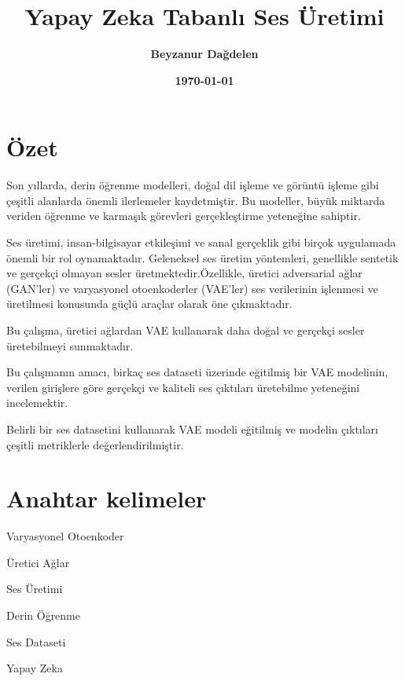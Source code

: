 \documentclass[12pt, a4paper]{article}
\title{\textbf{Yapay Zeka Tabanlı Ses Üretimi}\large }
\author{\textbf{Beyzanur Dağdelen}\large}
\date{\textbf{\today}}
\begin{document}
	
	\maketitle
	
	\thispagestyle{empty}
	
	\newpage
	\tableofcontents  %
	\newpage
	
	\section*{Özet }
	
	\vspace*{1\baselineskip}
	
	Son yıllarda, derin öğrenme modelleri, doğal dil işleme ve görüntü işleme gibi çeşitli alanlarda önemli ilerlemeler kaydetmiştir. Bu modeller, büyük miktarda veriden öğrenme ve karmaşık görevleri gerçekleştirme yeteneğine sahiptir.

	\vspace*{1\baselineskip}
	
	Ses üretimi, insan-bilgisayar etkileşimi ve sanal gerçeklik gibi birçok uygulamada önemli bir rol oynamaktadır. Geleneksel ses üretim yöntemleri, genellikle sentetik ve gerçekçi olmayan sesler üretmektedir.Özellikle, üretici adversarial ağlar (GAN'ler) ve varyasyonel otoenkoderler (VAE'ler) ses verilerinin işlenmesi ve üretilmesi konusunda güçlü araçlar olarak öne çıkmaktadır.
	
	\vspace*{1\baselineskip}
	
	Bu çalışma, üretici ağlardan VAE kullanarak daha doğal ve gerçekçi sesler üretebilmeyi sunmaktadır.
	
	\vspace*{1\baselineskip}
	
	Bu çalışmanın amacı, birkaç ses dataseti üzerinde eğitilmiş bir VAE modelinin, verilen girişlere göre gerçekçi ve kaliteli ses çıktıları üretebilme yeteneğini incelemektir.
	
	\vspace*{1\baselineskip}
	
	Belirli bir ses datasetini kullanarak VAE modeli eğitilmiş ve modelin çıktıları çeşitli metriklerle değerlendirilmiştir. 	
	
	\vspace*{2\baselineskip}
	\section*{\small \textbf{Anahtar kelimeler}}
	\begin{itemize}
		\small{
			\item Varyasyonel Otoenkoder
			\item Üretici Ağlar
			\item Ses Üretimi
			\item Derin Öğrenme
			\item Ses Dataseti
			\item Yapay Zeka
		}
	\end{itemize}
\end{document}
